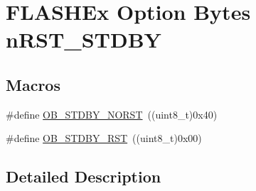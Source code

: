 \hypertarget{group___f_l_a_s_h_ex___option___bytes__n_r_s_t___s_t_d_b_y}{\section{F\-L\-A\-S\-H\-Ex Option Bytes n\-R\-S\-T\-\_\-\-S\-T\-D\-B\-Y}
\label{group___f_l_a_s_h_ex___option___bytes__n_r_s_t___s_t_d_b_y}
}
\subsection*{Macros}
\begin{DoxyCompactItemize}
\item 
\#define \hyperlink{group___f_l_a_s_h_ex___option___bytes__n_r_s_t___s_t_d_b_y_ga001d8bed938edd0640f5461f859c57af}{O\-B\-\_\-\-S\-T\-D\-B\-Y\-\_\-\-N\-O\-R\-S\-T}~((uint8\-\_\-t)0x40)
\item 
\#define \hyperlink{group___f_l_a_s_h_ex___option___bytes__n_r_s_t___s_t_d_b_y_ga69451a6f69247528f58735c9c83499ce}{O\-B\-\_\-\-S\-T\-D\-B\-Y\-\_\-\-R\-S\-T}~((uint8\-\_\-t)0x00)
\end{DoxyCompactItemize}


\subsection{Detailed Description}


